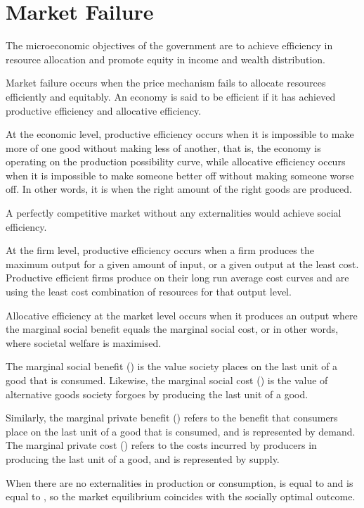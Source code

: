 \documentclass[Economics.tex]{subfiles}
\begin{document}
\chapter{Market Failure}
The microeconomic objectives of the government are to achieve efficiency in resource allocation and promote equity in income and wealth distribution.

Market failure occurs when the price mechanism fails to allocate resources efficiently and equitably. An economy is said to be efficient if it has achieved productive efficiency and allocative efficiency.

At the economic level, productive efficiency occurs when it is impossible to make more of one good without making less of another, that is, the economy is operating on the production possibility curve, while allocative efficiency occurs when it is impossible to make someone better off without making someone worse off. In other words, it is when the right amount of the right goods are produced.

A perfectly competitive market without any externalities would achieve social efficiency.

At the firm level, productive efficiency occurs when a firm produces the maximum output for a given amount of input, or a given output at the least cost. Productive efficient firms produce on their long run average cost curves and are using the least cost combination of resources for that output level.

Allocative efficiency at the market level occurs when it produces an output where the marginal social benefit equals the marginal social cost, or in other words, where societal welfare is maximised.

The marginal social benefit () is the value society places on the last unit of a good that is consumed. Likewise, the marginal social cost () is the value of alternative goods society forgoes by producing the last unit of a good.

Similarly, the marginal private benefit () refers to the benefit that consumers place on the last unit of a good that is consumed, and is represented by demand. The marginal private cost () refers to the costs incurred by producers in producing the last unit of a good, and is represented by supply.

When there are no externalities in production or consumption,  is equal to  and  is equal to , so the market equilibrium coincides with the socially optimal outcome.
\end{document}
